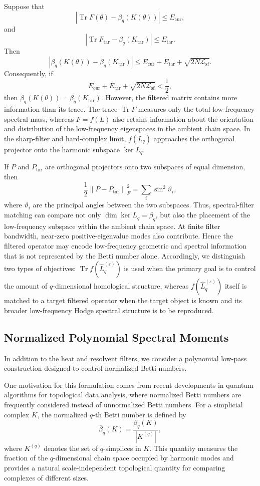 \documentclass[pdflatex,sn-mathphys-num]{sn-jnl}%
\theoremstyle{thmstyleone}%
\theoremstyle{thmstyletwo}%
\theoremstyle{thmstylethree}%
\begin{document}
Suppose that
\[
\left|
\operatorname{Tr}F(\theta)
-
\beta_q(K(\theta))
\right|
\le
E_{\mathrm{cur}},
\]
and
\[
\left|
\operatorname{Tr}F_{\mathrm{tar}}
-
\beta_q(K_{\mathrm{tar}})
\right|
\le
E_{\mathrm{tar}}.
\]
Then
\[
\left|
\beta_q(K(\theta))
-
\beta_q(K_{\mathrm{tar}})
\right|
\le
E_{\mathrm{cur}}
+
E_{\mathrm{tar}}
+
\sqrt{
2N\mathcal L_{\mathrm{sf}}
}.
\]
Consequently, if
\[
E_{\mathrm{cur}}
+
E_{\mathrm{tar}}
+
\sqrt{
2N\mathcal L_{\mathrm{sf}}
}
<
\frac12,
\]
then
$\beta_q(K(\theta))
=
\beta_q(K_{\mathrm{tar}})$.
However, the filtered matrix contains more information than its trace.
The trace
$\operatorname{Tr}F$
measures only the total low-frequency spectral mass, whereas
$F=f(L)$
also retains information about the orientation and distribution of the low-frequency eigenspaces in the ambient chain space.
In the sharp-filter and hard-complex limit, \(f(L_q)\) approaches the orthogonal projector onto the harmonic subspace $\ker L_q$.

If \(P\) and \(P_{\mathrm{tar}}\) are orthogonal projectors onto two subspaces of equal dimension, then
\[
\frac12
\left\|
P-P_{\mathrm{tar}}
\right\|_F^2
=
\sum_i
\sin^2\vartheta_i,
\]
where \(\vartheta_i\) are the principal angles between the two subspaces.
Thus, spectral-filter matching can compare not only $\dim\ker L_q
=
\beta_q$,
but also the placement of the low-frequency subspace within the ambient chain space.
At finite filter bandwidth, near-zero positive-eigenvalue modes also contribute. Hence the filtered operator may encode low-frequency geometric and spectral information that is not represented by the Betti number alone.
Accordingly, we distinguish two types of objectives:
$\operatorname{Tr}
f(\widehat L_q^{(\varepsilon)})$
is used when the primary goal is to control the amount of \(q\)-dimensional homological structure, whereas
$f(\widehat L_q^{(\varepsilon)})$
itself is matched to a target filtered operator when the target object is known and its broader low-frequency Hodge spectral structure is to be reproduced.




\subsection{Normalized Polynomial Spectral Moments}

In addition to the heat and resolvent filters, we consider a polynomial low-pass construction designed to control normalized Betti numbers.

One motivation for this formulation comes from recent developments in quantum algorithms for topological data analysis, where normalized Betti numbers are frequently considered instead of unnormalized Betti numbers. For a simplicial complex \(K\), the normalized \(q\)-th Betti number is defined by
\[
\overline\beta_q(K)
=
\frac{
\beta_q(K)
}{
|K^{(q)}|
},
\]
where \(K^{(q)}\) denotes the set of \(q\)-simplices in \(K\).
This quantity measures the fraction of the \(q\)-dimensional chain space occupied by harmonic modes and provides a natural scale-independent topological quantity for comparing complexes of different sizes.
\end{document}
